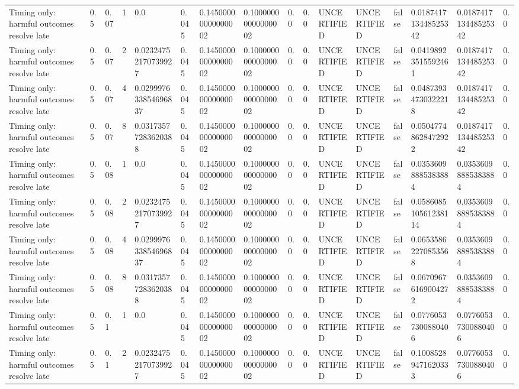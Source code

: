 \begin{tabular}{llllllllllllllll}
Timing only: harmful outcomes resolve late & 0.5 & 0.07 & 1 & 0.0 & 0.045 & 0.14500000000000002 & 0.10000000000000002 & 0.0 & 0.0 & UNCERTIFIED & UNCERTIFIED & false & 0.018741713448525342 & 0.018741713448525342 & 0.0 \\
Timing only: harmful outcomes resolve late & 0.5 & 0.07 & 2 & 0.02324752170739927 & 0.045 & 0.14500000000000002 & 0.10000000000000002 & 0.0 & 0.0 & UNCERTIFIED & UNCERTIFIED & false & 0.04198923515592461 & 0.018741713448525342 & 0.0 \\
Timing only: harmful outcomes resolve late & 0.5 & 0.07 & 4 & 0.029997633854696837 & 0.045 & 0.14500000000000002 & 0.10000000000000002 & 0.0 & 0.0 & UNCERTIFIED & UNCERTIFIED & false & 0.04873934730322218 & 0.018741713448525342 & 0.0 \\
Timing only: harmful outcomes resolve late & 0.5 & 0.07 & 8 & 0.03173577283620388 & 0.045 & 0.14500000000000002 & 0.10000000000000002 & 0.0 & 0.0 & UNCERTIFIED & UNCERTIFIED & false & 0.05047748628472922 & 0.018741713448525342 & 0.0 \\
Timing only: harmful outcomes resolve late & 0.5 & 0.08 & 1 & 0.0 & 0.045 & 0.14500000000000002 & 0.10000000000000002 & 0.0 & 0.0 & UNCERTIFIED & UNCERTIFIED & false & 0.03536098885383884 & 0.03536098885383884 & 0.0 \\
Timing only: harmful outcomes resolve late & 0.5 & 0.08 & 2 & 0.02324752170739927 & 0.045 & 0.14500000000000002 & 0.10000000000000002 & 0.0 & 0.0 & UNCERTIFIED & UNCERTIFIED & false & 0.058608510561238114 & 0.03536098885383884 & 0.0 \\
Timing only: harmful outcomes resolve late & 0.5 & 0.08 & 4 & 0.029997633854696837 & 0.045 & 0.14500000000000002 & 0.10000000000000002 & 0.0 & 0.0 & UNCERTIFIED & UNCERTIFIED & false & 0.06535862270853568 & 0.03536098885383884 & 0.0 \\
Timing only: harmful outcomes resolve late & 0.5 & 0.08 & 8 & 0.03173577283620388 & 0.045 & 0.14500000000000002 & 0.10000000000000002 & 0.0 & 0.0 & UNCERTIFIED & UNCERTIFIED & false & 0.06709676169004272 & 0.03536098885383884 & 0.0 \\
Timing only: harmful outcomes resolve late & 0.5 & 0.1 & 1 & 0.0 & 0.045 & 0.14500000000000002 & 0.10000000000000002 & 0.0 & 0.0 & UNCERTIFIED & UNCERTIFIED & false & 0.07760537300880406 & 0.07760537300880406 & 0.0 \\
Timing only: harmful outcomes resolve late & 0.5 & 0.1 & 2 & 0.02324752170739927 & 0.045 & 0.14500000000000002 & 0.10000000000000002 & 0.0 & 0.0 & UNCERTIFIED & UNCERTIFIED & false & 0.10085289471620333 & 0.07760537300880406 & 0.0 \\

\end{tabular}
